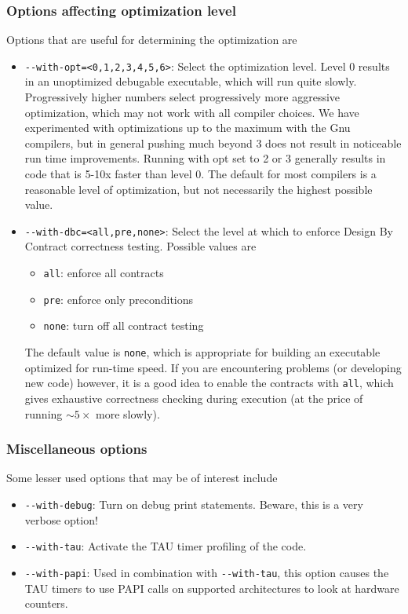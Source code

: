 \documentclass{article}
\begin{document}
\subsubsection{Options affecting optimization level}
Options that are useful for determining the optimization are
\begin{itemize}
\item \verb+--with-opt=<0,1,2,3,4,5,6>+: Select the optimization level.  Level 0
results in an unoptimized debugable executable, which will run quite slowly.
Progressively higher numbers select progressively more aggressive optimization,
which may not work with all compiler choices.  We have experimented with
optimizations up to the maximum with the Gnu compilers, but in general pushing
much beyond 3 does not result in noticeable run time improvements.  Running with
opt set to 2 or 3 generally results in code that is 5-10x faster than level 0.
The default for most compilers is a reasonable level of optimization, but not
necessarily the highest possible value.
\item \verb+--with-dbc=<all,pre,none>+: Select the level at which to enforce
Design By Contract correctness testing.  Possible values are
\begin{itemize}
\item \verb+all+: enforce all contracts
\item \verb+pre+: enforce only preconditions
\item \verb+none+: turn off all contract testing
\end{itemize}
The default value is \verb+none+, which is appropriate for building an
executable optimized for run-time speed.  If you are encountering problems (or
developing new code) however, it is a good idea to enable the contracts with
\verb+all+, which gives exhaustive correctness checking during execution (at the
price of running $\sim 5\times$ more slowly).
\end{itemize}

\subsubsection{Miscellaneous options}
Some lesser used options that may be of interest include
\begin{itemize}
\item \verb+--with-debug+: Turn on debug print statements.  Beware, this is a
very verbose option!
\item \verb+--with-tau+: Activate the TAU timer profiling of the code.
\item \verb+--with-papi+: Used in combination with \verb+--with-tau+, this
  option causes the TAU timers to use PAPI calls on supported architectures to
  look at hardware counters.
\end{itemize}
\end{document}
